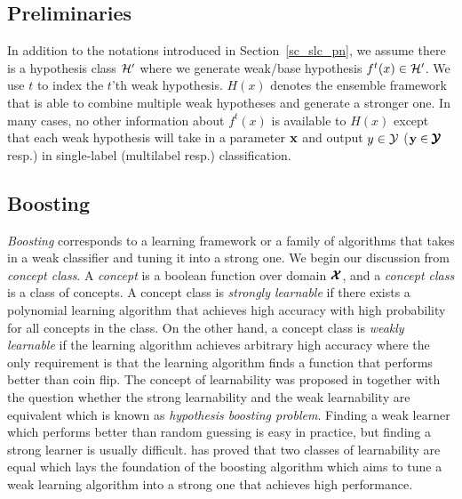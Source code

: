 {%
%
\subsection{Preliminaries} \label{sc_em_pn}

In addition to the notations introduced in Section~\ref{sc_slc_pn}, we assume there is a hypothesis class $\mathcal{H}'$ where we generate weak/base hypothesis $f^t(x)\in\mathcal{H}'$.
We use $t$ to index the $t$'th weak hypothesis.
$H(x)$ denotes the ensemble framework that is able to combine multiple weak hypotheses and generate a stronger one.
In many cases, no other information about $f^t(x)$ is available to $H(x)$ except that each weak hypothesis will take in a parameter $\mathbf {x}$ and output $y\in\mathcal{Y}$ ($\mathbf {y}\in\pmb {\mathcal{Y}}$ resp.) in single-label (multilabel resp.) classification.


\subsection{Boosting} \label{sc_boosting}

\textit{Boosting} corresponds to a learning framework or a family of algorithms that takes in a weak classifier and tuning it into a strong one.
We begin our discussion from  \textit{concept class}.
A \textit{concept} is a boolean function over domain $\pmb {\mathcal{X}}$, and a \textit{concept class} is a class of concepts.
A concept class is \textit{strongly learnable} if there exists a polynomial learning algorithm that achieves high accuracy with high probability for all concepts in the class.
On the other hand, a concept class is \textit{weakly learnable} if the learning algorithm achieves arbitrary high accuracy where the only requirement is that the learning algorithm finds a function that performs better than coin flip.
The concept of learnability was proposed in \citep{Kearns94cryptographic} together with the question whether the strong learnability and the weak learnability are equivalent which is known as \textit{hypothesis boosting problem}.
Finding a weak learner which performs better than random guessing is easy in practice, but finding a strong learner is usually difficult.
\citet{Schapire90the} has proved that two classes of learnability are equal which lays the foundation of the boosting algorithm which aims to tune a weak learning algorithm into a strong one that achieves high performance.

}
